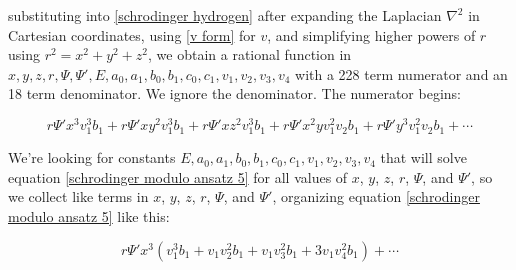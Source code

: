 \documentclass{article}
\begin{document}
substituting into \eqref{schrodinger hydrogen} after expanding the Laplacian $\nabla^2$ in Cartesian coordinates,
using \eqref{v form} for $v$, and simplifying higher powers of $r$ using $r^2=x^2+y^2+z^2$, we obtain
a rational function in $x, y, z, r, \Psi, \Psi', E, a_0, a_1, b_0, b_1, c_0, c_1, v_1, v_2, v_3, v_4$
with a 228 term numerator and an 18 term denominator.  We ignore the denominator.  The numerator begins:

\begin{equation}
\label{schrodinger modulo ansatz 5}
r \Psi' x^{3} v_{1}^{3} b_{1} + r \Psi' x y^{2} v_{1}^{3} b_{1} + r \Psi' x z^{2} v_{1}^{3} b_{1} + r \Psi' x^{2} y v_{1}^{2} v_{2} b_{1} + r \Psi' y^{3} v_{1}^{2} v_{2} b_{1} + \cdots
\end{equation}

We're looking for
constants $E, a_0, a_1, b_0, b_1, c_0, c_1, v_1, v_2, v_3, v_4$
that will solve equation \eqref{schrodinger modulo ansatz 5} for all values of $x$, $y$, $z$, $r$,
$\Psi$, and $\Psi'$, so
we collect like terms in $x$, $y$, $z$, $r$, $\Psi$, and $\Psi'$, organizing equation \eqref{schrodinger modulo ansatz 5} like this:

\begin{equation}
\label{example collection of like terms}
r \Psi' x^{3} \left( v_{1}^{3} b_{1} + v_{1} v_{2}^{2} b_{1} + v_{1} v_{3}^{2} b_{1} + 3 v_{1} v_{4}^{2} b_{1}\right) + \cdots
\end{equation}
\end{document}
